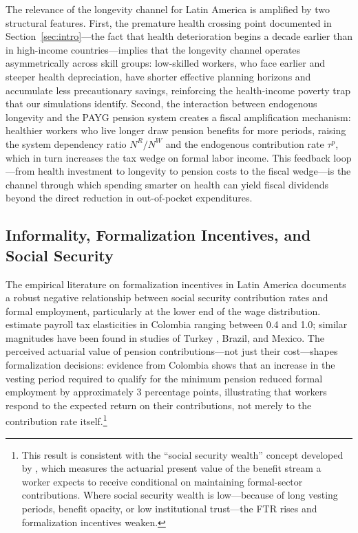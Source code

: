 \documentclass[12pt,a4paper]{article}
\begin{document}
The relevance of the longevity channel for Latin America is amplified by two structural features. First, the premature health crossing point documented in Section~\ref{sec:intro}---the fact that health deterioration begins a decade earlier than in high-income countries---implies that the longevity channel operates asymmetrically across skill groups: low-skilled workers, who face earlier and steeper health depreciation, have shorter effective planning horizons and accumulate less precautionary savings, reinforcing the health-income poverty trap that our simulations identify. Second, the interaction between endogenous longevity and the PAYG pension system creates a fiscal amplification mechanism: healthier workers who live longer draw pension benefits for more periods, raising the system dependency ratio $N^R/N^W$ and the endogenous contribution rate $\tau^p$, which in turn increases the tax wedge on formal labor income. This feedback loop---from health investment to longevity to pension costs to the fiscal wedge---is the channel through which spending smarter on health can yield fiscal dividends beyond the direct reduction in out-of-pocket expenditures.

\subsection{Informality, Formalization Incentives, and Social Security}
\label{subsec:lit_informality}

The empirical literature on formalization incentives in Latin America documents a robust negative relationship between social security contribution rates and formal employment, particularly at the lower end of the wage distribution. \citet{Kugler2017} estimate payroll tax elasticities in Colombia ranging between 0.4 and 1.0; similar magnitudes have been found in studies of Turkey \citep{AcarTansel2019}, Brazil, and Mexico. The perceived actuarial value of pension contributions---not just their cost---shapes formalization decisions: evidence from Colombia shows that an increase in the vesting period required to qualify for the minimum pension reduced formal employment by approximately 3 percentage points, illustrating that workers respond to the expected return on their contributions, not merely to the contribution rate itself.\footnote{This result is consistent with the ``social security wealth'' concept developed by \citet{WorldBankInformalizing2025}, which measures the actuarial present value of the benefit stream a worker expects to receive conditional on maintaining formal-sector contributions. Where social security wealth is low---because of long vesting periods, benefit opacity, or low institutional trust---the FTR rises and formalization incentives weaken.}
\end{document}
